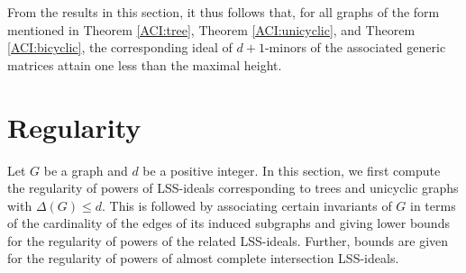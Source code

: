 \documentclass[11pt,a4paper,reqno]{amsart}
\newtheorem{cor}[thm]{Corollary}
\theoremstyle{definition}
\newtheorem{remark}[thm]{Remark}
\numberwithin{equation}{section}
\DeclareMathOperator{\het}{ht}
\begin{document}


From the results in this section, it thus follows that, for all graphs of the form mentioned in Theorem \ref{ACI:tree}, Theorem \ref{ACI:unicyclic}, and Theorem \ref{ACI:bicyclic}, the corresponding ideal of $d+1$-minors of the associated generic matrices attain one less than the maximal height.



\section{Regularity}

Let $G$ be a graph and $d$ be a positive integer. In this section, we first compute the regularity of powers of LSS-ideals corresponding to trees and unicyclic graphs with $ \Delta(G) \leq d$. This is followed by associating certain invariants of $G$ in terms of the cardinality of the edges of its induced subgraphs and giving lower bounds for the regularity of powers of the related LSS-ideals.
Further, bounds are given for the regularity of powers of almost complete intersection LSS-ideals. %
\end{document}
